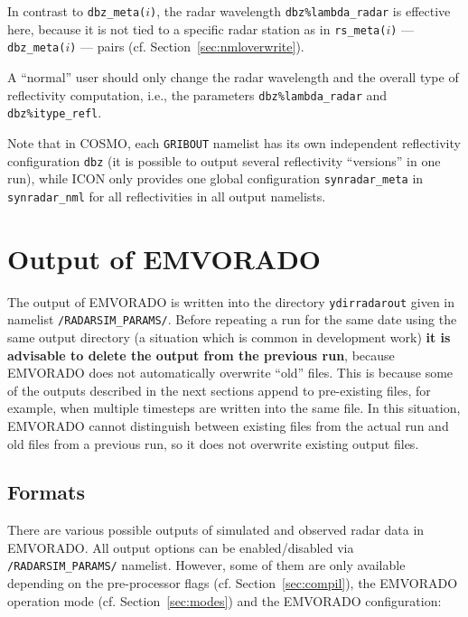\documentclass[10pt,a4paper,twoside,headinclude,footinclude,parskip=half]{scrartcl}
\newcommand{\myaktuellesection}{sec:intro}%
\newcommand{\labelsec}[1]{\label{#1}\renewcommand{\myaktuellesection}{#1}}%
\newcommand{\labelsec}[1]{\label{#1}}%
\newcommand{\srcform}[1]{\mbox{\texttt{#1}}\xspace}%
\begin{document}
In contrast to \srcform{dbz_meta($i$)}, the radar wavelength \srcform{dbz\%lambda_radar} is effective here, because it is
not tied to a specific radar station as in \srcform{rs_meta($i$)} --- \srcform{dbz_meta($i$)} --- pairs (cf. Section~\ref{sec:nmloverwrite}).

A ``normal'' user should only change the radar wavelength and the overall type of reflectivity computation, i.e., the parameters \srcform{dbz\%lambda_radar} and \srcform{dbz\%itype_refl}.

Note that in COSMO, each \srcform{GRIBOUT} namelist has its own independent reflectivity configuration \srcform{dbz} (it is possible to output several reflectivity ``versions'' in one run), while ICON only provides one global configuration \srcform{synradar_meta} in \srcform{synradar_nml} for all reflectivities in all output namelists.

\newpage




\section{Output of EMVORADO}
\labelsec{sec:output}

The output of EMVORADO is written into the directory \srcform{ydirradarout} given in namelist \srcform{/RADARSIM_PARAMS/}. Before repeating a run for the same date using the same output directory (a situation which is common in development work) \textbf{it is advisable to delete the output from the previous run}, because EMVORADO does not automatically overwrite ``old'' files.
This is because some of the outputs described in the next sections append to pre-existing files, for example, when multiple timesteps are written into the same file.
In this situation, EMVORADO cannot distinguish between existing files from the actual run and old files from a previous run, so it does not overwrite existing output files.

\subsection{Formats}
\labelsec{sec:output:format}

There are various possible outputs of simulated and observed radar data
in EMVORADO. All output options can be enabled/disabled via \srcform{/RADARSIM_PARAMS/} namelist. However, some 
of them are only available depending on the pre-processor flags (cf. Section~\ref{sec:compil}),
the EMVORADO operation mode (cf. Section~\ref{sec:modes}) and the EMVORADO configuration:
\end{document}
